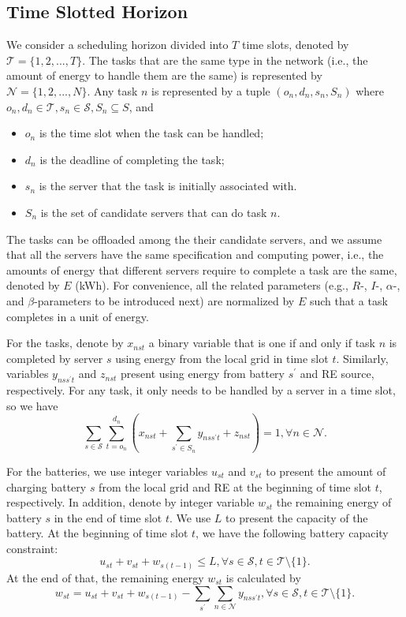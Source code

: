 \documentclass[conference, 10pt, ﬁnal, letterpaper, twocolumn]{IEEEtran}
\begin{document}
\subsection{Time Slotted Horizon}
We consider a scheduling horizon divided into $T$ time slots, denoted by $\mathcal{T} = \{1,2,...,T\}$. The tasks that are the same type in the network (i.e., the amount of energy to handle them are the same) is represented by $\mathcal{N} = \{1, 2, ..., N\}$. Any task $n$ is represented by a tuple $(o_n, d_n, s_n, S_n)$ where $o_n, d_n \in \mathcal{T}, s_n \in \mathcal{S}, S_n \subseteq S$, and
\begin{itemize}
    \item $o_n$ is the time slot when the task can be handled;
    \item $d_n$ is the deadline of completing the task;
    \item $s_n$ is the server that the task is initially associated with.
    \item $S_n$ is the set of candidate servers that can do task $n$.
\end{itemize}
The tasks can be offloaded among the their candidate servers, and we assume that all the servers have the same specification and computing power, i.e., the amounts of energy that different servers require to complete a task are the same, denoted by $E$ (kWh). For convenience, all the related parameters (e.g., $R$-, $I$-, $\alpha$-, and $\beta$-parameters to be introduced next) are normalized by $E$ such that a task completes in a unit of energy.

For the tasks, denote by $x_{nst}$ a binary variable that is one if and only if task $n$ is completed by server $s$ using energy from the local grid in time slot $t$. Similarly, variables $y_{nss^\prime t}$ and $z_{nst}$ present using energy from battery $s^\prime$ and RE source, respectively. For any task, it only needs to be handled by a server in a time slot, so we have
\begin{equation}\label{c1}
    \sum_{s \in \mathcal{S}} \sum^{d_n}_{t = o_n} ( x_{nst} + \sum_{s^\prime \in S_n}  y _{nss^\prime t} + z_{nst}) = 1, \forall n \in \mathcal{N}.
\end{equation}

For the batteries, we use integer variables $u_{st}$ and $v_{st}$ to present the amount of charging battery $s$ from the local grid and RE at the beginning of time slot $t$, respectively. In addition, denote by integer variable $w_{st}$ the remaining energy of battery $s$ in the end of time slot $t$. We use $L$ to present the capacity of the battery. At the beginning of time slot $t$, we have the following battery capacity constraint:
\begin{equation}\label{c2}
    u_{st} + v_{st} + w_{s(t-1)} \leq L, \forall s \in \mathcal{S}, t \in \mathcal{T} \setminus \{1\}.
\end{equation}
At the end of that, the remaining energy $w_{st}$ is calculated by
\begin{equation}\label{c3}
    w_{st} = u_{st} + v_{st} + w_{s(t-1)} - \sum_{s^\prime}\sum_{n\in\mathcal{N}} y_{nss^\prime t}, \forall s \in \mathcal{S}, t \in \mathcal{T} \setminus \{1\}.
\end{equation}
\end{document}
